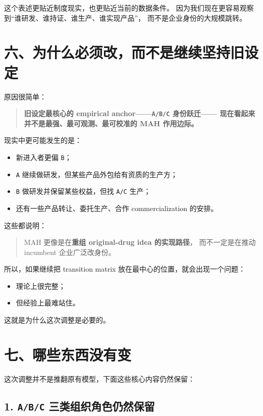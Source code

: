 \documentclass[12pt]{ctexart}
\begin{document}
这个表述更贴近制度现实，也更贴近当前的数据条件。
因为我们现在更容易观察到“谁研发、谁持证、谁生产、谁实现产品”，
而不是企业身份的大规模跳转。

\section{六、为什么必须改，而不是继续坚持旧设定}

原因很简单：

\begin{quote}
\textbf{旧设定最核心的 empirical anchor——\texttt{A/B/C} 身份跃迁——
现在看起来并不是最强、最可观测、最可校准的 MAH 作用边际。}
\end{quote}

现实中更可能发生的是：

\begin{itemize}[leftmargin=2em]
    \item 新进入者更偏 \texttt{B}；
    \item \texttt{A} 继续做研发，但某些产品外包给有资质的生产方；
    \item \texttt{B} 做研发并保留某些权益，但找 \texttt{A/C} 生产；
    \item 还有一些产品转让、委托生产、合作 commercialization 的安排。
\end{itemize}

这些都说明：

\begin{quote}
MAH 更像是在\textbf{重组 original-drug idea 的实现路径}，
而不一定是在推动 incumbent 企业广泛改身份。
\end{quote}

所以，如果继续把 transition matrix 放在最中心的位置，就会出现一个问题：

\begin{itemize}[leftmargin=2em]
    \item 理论上很完整；
    \item 但经验上最难站住。
\end{itemize}

这就是为什么这次调整是必要的。

\section{七、哪些东西没有变}

这次调整并不是推翻原有模型，下面这些核心内容仍然保留：

\subsection*{1. \texttt{A/B/C} 三类组织角色仍然保留}
\end{document}

